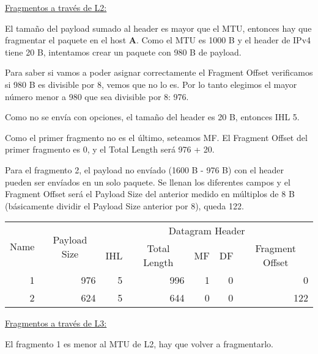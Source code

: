 \noindent
\underline{Fragmentos a través de L2:}

\vspace{\baselineskip}
El tamaño del payload sumado al header es mayor que el MTU, entonces hay que fragmentar el paquete en el host \textbf{A}. Como el MTU es 1000 B y el header de IPv4 tiene 20 B, intentamos crear un paquete con 980 B de payload.

Para saber si vamos a poder asignar correctamente el Fragment Offset verificamos si 980 B es divisible por 8, vemos que no lo es. Por lo tanto elegimos el mayor número menor a 980 que sea divisible por 8: 976.

Como no se envía con opciones, el tamaño del header es 20 B, entonces IHL 5.

Como el primer fragmento no es el último, seteamos MF. El Fragment Offset del primer fragmento es 0, y el Total Length será 976 + 20.

Para el fragmento 2, el payload no envíado (1600 B - 976 B) con el header pueden ser envíados en un solo paquete. Se llenan los diferentes campos y el Fragment Offset será el Payload Size del anterior medido en múltiplos de 8 B (básicamente dividir el Payload Size anterior por 8), queda 122.


\begin{table}[H]
    \renewcommand{\arraystretch}{1.5}
    \centering
    \begin{tabular}{|c|c|crrrr|}
    \hline
    \multirow{2}{*}{Name} & \multirow{2}{*}{Payload Size} & \multicolumn{5}{c|}{Datagram Header} \\ \cline{3-7} 
        &  & \multicolumn{1}{c|}{IHL} & \multicolumn{1}{c|}{Total Length} & \multicolumn{1}{c|}{MF} & \multicolumn{1}{c|}{DF} & \multicolumn{1}{c|}{Fragment Offset} \\ \hline
    \multicolumn{1}{|r|}{1} & \multicolumn{1}{r|}{976} & \multicolumn{1}{r|}{5} & \multicolumn{1}{r|}{996} & \multicolumn{1}{r|}{1} & \multicolumn{1}{r|}{0} & 0 \\ \hline
    \multicolumn{1}{|r|}{2} & \multicolumn{1}{r|}{624} & \multicolumn{1}{r|}{5} & \multicolumn{1}{r|}{644} & \multicolumn{1}{r|}{0} & \multicolumn{1}{r|}{0} & 122 \\ \hline
    \end{tabular}
\end{table}


\noindent
\underline{Fragmentos a través de L3:}

\vspace{\baselineskip}
El fragmento 1 es menor al MTU de L2, hay que volver a fragmentarlo.

